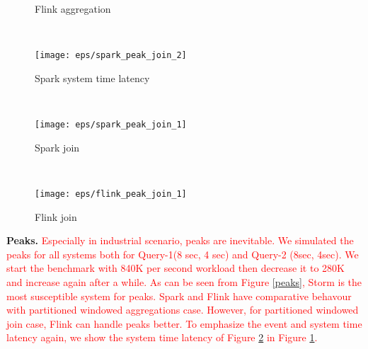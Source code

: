 {\begin{figure*}
\begin{subfigure}[b]{0.3\textwidth}
		
		\caption{ Flink aggregation}
	\end{subfigure}
	~ 
	\begin{subfigure}[b]{0.3\textwidth}
		
		\texttt{[image: eps/spark\_peak\_join\_2]}

		\caption{Spark system time latency }
		\label{peaks_system_time}
	\end{subfigure}
	~ 
	\begin{subfigure}[b]{0.3\textwidth}
		
		\texttt{[image: eps/spark\_peak\_join\_1]}

		\caption{ Spark join}
		\label{peaks_spark_join}
	\end{subfigure}
	~ 
	\begin{subfigure}[b]{0.3\textwidth}
		
		\texttt{[image: eps/flink\_peak\_join\_1]}
		
		\caption{ Flink join }
	\end{subfigure}
	\caption{\textcolor{red}{Peaks}}
	\label{peaks}
\end{figure*}


\textbf{Peaks.}
\textcolor{red}{Especially in industrial scenario, peaks are inevitable. We simulated the peaks for all systems both for Query-1(8 sec, 4 sec) and Query-2 (8sec, 4sec). We start the benchmark with 840K per second workload then decrease it to 280K and increase again after a while.   As can be seen from Figure \ref{peaks}, Storm is the most susceptible system for peaks. Spark and Flink have comparative behavour with partitioned windowed aggregations case. However, for partitioned windowed join case, Flink can handle peaks better. To emphasize the event and system time latency again, we show the system time latency of Figure \ref{peaks_spark_join} in Figure \ref{peaks_system_time}.  }

}
